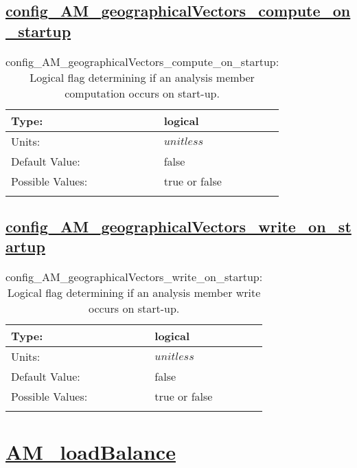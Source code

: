 \subsection[config\_AM\_geographicalVectors\_compute\_on\_startup]{\hyperref[sec:nm_tab_AM_geographicalVectors]{config\_AM\_geographicalVectors\_compute\_on\_startup}}
\label{subsec:nm_sec_config_AM_geographicalVectors_compute_on_startup}
\begin{center}
\begin{longtable}{| p{2.0in} || p{4.0in} |}
    \hline
    Type: & logical \\
    \hline
    Units: & $unitless$ \\
    \hline
    Default Value: & false \\
    \hline
    Possible Values: & true or false \\
    \hline
    \caption{config\_AM\_geographicalVectors\_compute\_on\_startup: Logical flag determining if an analysis member computation occurs on start-up.}
\end{longtable}
\end{center}
\subsection[config\_AM\_geographicalVectors\_write\_on\_startup]{\hyperref[sec:nm_tab_AM_geographicalVectors]{config\_AM\_geographicalVectors\_write\_on\_startup}}
\label{subsec:nm_sec_config_AM_geographicalVectors_write_on_startup}
\begin{center}
\begin{longtable}{| p{2.0in} || p{4.0in} |}
    \hline
    Type: & logical \\
    \hline
    Units: & $unitless$ \\
    \hline
    Default Value: & false \\
    \hline
    Possible Values: & true or false \\
    \hline
    \caption{config\_AM\_geographicalVectors\_write\_on\_startup: Logical flag determining if an analysis member write occurs on start-up.}
\end{longtable}
\end{center}
\section[AM\_loadBalance]{\hyperref[sec:nm_tab_AM_loadBalance]{AM\_loadBalance}}
\label{sec:nm_sec_AM_loadBalance}
